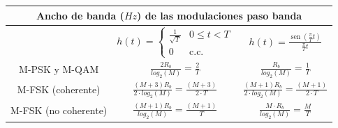 \documentclass[es]{article}
\DeclareMathOperator{\sen}{sen}
\begin{document}
\begin{center}
\begin{tabular}{|c|c|}
        \end{tabular}
    \renewcommand{\arraystretch}{1}
        \vspace{0.5cm}


        \renewcommand{\arraystretch}{2}
        \begin{tabular}{|c|c|c|}
            \multicolumn{3}{c}{{\bf Ancho de banda ($Hz$) de las modulaciones paso banda }} \\
            \hline
             & $ h(t) = \left \{ \begin{array}{lc} \displaystyle\frac{1}{\sqrt{T}} & 0\leq t < T \\ 0 & \text{c.c.} \end{array}\right. $ & $ h(t) = \displaystyle\frac{\sen\left ( \displaystyle\frac{\pi}{T} t \right ) }{\displaystyle\frac{\pi}{T}t}$ \\
            \hline
            M-PSK y M-QAM & $\displaystyle\frac{2 R_b}{log_2(M)} = \displaystyle\frac{2}{T}$ & $\displaystyle\frac{R_b}{log_2(M)} = \displaystyle\frac{1}{T}$ \\[1ex]
            \hline
            M-FSK (coherente) & $\displaystyle\frac{(M+3) R_b}{2 \cdot log_2(M)} = \displaystyle\frac{(M+3)}{2\cdot T}$ & $\displaystyle\frac{(M+1) R_b}{2 \cdot log_2(M)} = \displaystyle\frac{(M+1)}{2\cdot T}$ \\[1ex]
            \hline
            M-FSK (no coherente) & $\displaystyle\frac{(M+1) R_b}{log_2(M)} = \displaystyle\frac{(M+1)}{T}$ & $\displaystyle\frac{M \cdot R_b}{log_2(M)} = \displaystyle\frac{M}{T}$ \\[1ex]
            \hline
            
        \end{tabular}
        \renewcommand{\arraystretch}{1}
        \vspace{0.5cm}
    

\end{center}
\end{document}
